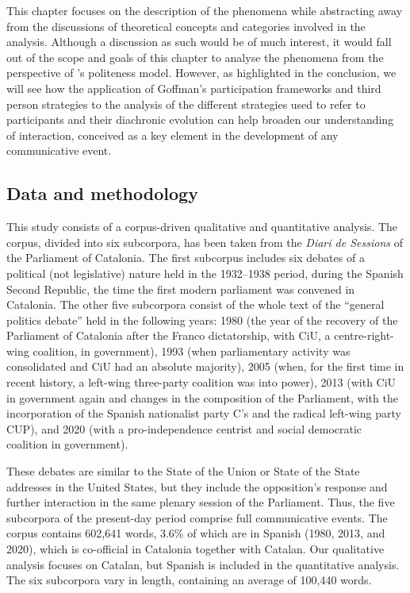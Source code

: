 \documentclass[output=paper]{langscibook}
\begin{document}
This chapter focuses on the description of the phenomena while abstracting away from the discussions of theoretical concepts and categories involved in the analysis. Although a discussion as such would be of much interest, it would fall out of the scope and goals of this chapter to analyse the phenomena from the perspective of \citet{BrownLevinson1987}’s politeness model. However, as highlighted in the conclusion, we will see how the application of Goffman’s participation frameworks and third person strategies to the analysis of the different strategies used to refer to participants and their diachronic evolution can help broaden our understanding of interaction, conceived as a key element in the development of any communicative event.



 
\subsection{Data and methodology}\label{sec:nogue:1.2}



This study consists of a corpus-driven qualitative and quantitative analysis. The corpus, divided into six subcorpora, has been taken from the \textit{Diari de Sessions} of the Parliament of Catalonia. The first subcorpus includes six debates of a political (not legislative) nature held in the 1932–1938 period, during the Spanish Second Republic, the time the first modern parliament was convened in Catalonia. The other five subcorpora consist of the whole text of the “general politics debate” held in the following years: 1980 (the year of the recovery of the Parliament of Catalonia after the Franco dictatorship, with CiU, a centre-right-wing coalition, in government), 1993 (when parliamentary activity was consolidated and CiU had an absolute majority), 2005 (when, for the first time in recent history, a left-wing three-party coalition was into power), 2013 (with CiU in government again and changes in the composition of the Parliament, with the incorporation of the Spanish nationalist party C’s and the radical left-wing party CUP), and 2020 (with a pro-independence centrist and social democratic coalition in government). 



These debates are similar to the State of the Union or State of the State addresses in the United States, but they include the opposition’s response and further interaction in the same plenary session of the Parliament. Thus, the five subcorpora of the present-day period comprise full communicative events. The corpus contains 602,641 words, 3.6\% of which are in Spanish (1980, 2013, and 2020), which is co-official in Catalonia together with Catalan. Our qualitative analysis focuses on Catalan, but Spanish is included in the quantitative analysis. The six subcorpora vary in length, containing an average of 100,440 words.
\end{document}
